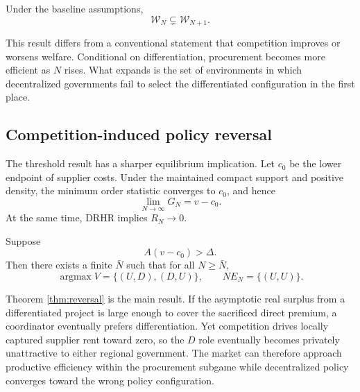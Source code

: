 \begin{corollary}
\label{cor:wedge-expansion}
Under the baseline assumptions,
\begin{equation}
\mathcal W_N\subsetneq \mathcal W_{N+1}.
\label{eq:wedge-nesting}
\end{equation}
\end{corollary}

This result differs from a conventional statement that competition improves or worsens welfare. Conditional on differentiation, procurement becomes more efficient as $N$ rises. What expands is the set of environments in which decentralized governments fail to select the differentiated configuration in the first place.

\subsection{Competition-induced policy reversal}

The threshold result has a sharper equilibrium implication. Let $c_0$ be the lower endpoint of supplier costs. Under the maintained compact support and positive density, the minimum order statistic converges to $c_0$, and hence
\begin{equation}
\lim_{N\to\infty}G_N=v-c_0.
\label{eq:Glimit}
\end{equation}
At the same time, DRHR implies $R_N\to0$.

\begin{theorem}
\label{thm:reversal}
Suppose
\begin{equation}
A(v-c_0)>\Delta.
\label{eq:reversal-condition}
\end{equation}
Then there exists a finite $\bar N$ such that for all $N\ge\bar N$,
\begin{equation}
\operatorname{argmax}V=\{(U,D),(D,U)\},
\qquad
NE_N=\{(U,U)\}.
\label{eq:reversal-result}
\end{equation}
\end{theorem}

Theorem \ref{thm:reversal} is the main result. If the asymptotic real surplus from a differentiated project is large enough to cover the sacrificed direct premium, a coordinator eventually prefers differentiation. Yet competition drives locally captured supplier rent toward zero, so the $D$ role eventually becomes privately unattractive to either regional government. The market can therefore approach productive efficiency within the procurement subgame while decentralized policy converges toward the wrong policy configuration.

